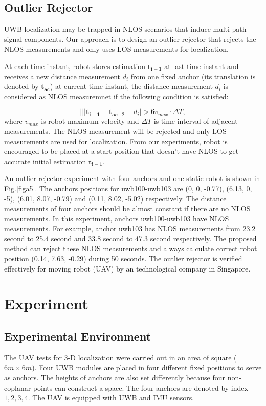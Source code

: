 \documentclass[journal]{IEEEtran}
\begin{document}
\subsection{Outlier Rejector}

UWB localization may be trapped in NLOS scenarios that induce multi-path signal components. Our approach is to design an outlier rejector that rejects the NLOS measurements and only uses LOS measurements for localization. 

At each time instant, robot stores estimation $\mathbf{t_{i-1}}$ at last time instant and receives a new distance measurement ${d_i}$ from one fixed anchor (its translation is denoted by $\mathbf{t_{ac}}$) at current time instant, the distance measurement ${d_i}$ is considered as NLOS measuremnet if the following condition is satisfied: 

\begin{equation}
|||\mathbf{t_{i-1}}-\mathbf{t_{ac}}||_2-d_i|> 6v_{max} \cdot \Delta T,
\end{equation}
where $v_{max}$ is robot maximum velocity and $\Delta T$ is time interval of adjacent measurements. The NLOS measurement will be rejected and only LOS measurements are used for localization. From our experiments, robot is encouraged to be placed at a start position that doesn't have NLOS to get accurate initial estimation $\mathbf{t_{i-1}}$.

An outlier rejector experiment with four anchors and one static robot is shown in Fig.\ref{figa5}. The anchors positions for uwb100-uwb103 are (0, 0, -0.77), (6.13, 0, -5), (6.01, 8.07, -0.79) and (0.11, 8.02, -5.02) respectively. The distance measurements of four anchors should be almost constant if there are no NLOS measurements. In this experiment, anchors uwb100-uwb103 have NLOS measurements. For example, anchor uwb103 has NLOS measurements from 23.2 second to 25.4 second and 33.8 second to 47.3 second respectively. The proposed method can reject these NLOS measurements and always calculate correct robot position (0.14, 7.63, -0.29) during 50 seconds. The outlier rejector is verified effectively for moving robot (UAV) by an technological company in Singapore. 

\section{Experiment}\label{a8}

\subsection{Experimental  Environment}
The UAV tests for 3-D localization were carried out in an area of square ($6m \times 6m$). Four UWB modules are placed in four different fixed positions to serve as anchors. The heights of anchors are also set differently because four non-coplanar points can construct a space. The four anchors are denoted by index $1,2,3,4$. The UAV is equipped with UWB and IMU sensors. 
\end{document}
